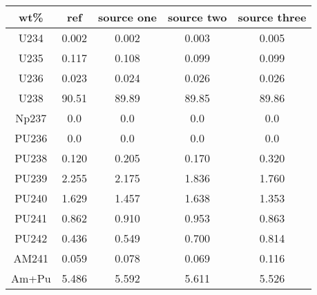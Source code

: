 	\begin{tabular}{ccccc}
		\hline
		\textbf{wt\%} & \textbf{ref} & \textbf{source one} & \textbf{source two} & \textbf{source three} \\ 
		\hline
		U234 & 0.002 & 0.002 & 0.003 & 0.005 \\ 
		U235 & 0.117 & 0.108 & 0.099 & 0.099 \\ 
		U236 & 0.023 & 0.024 & 0.026 & 0.026 \\ 
		U238 & 90.51 & 89.89 & 89.85 & 89.86 \\ 
		Np237 & 0.0 & 0.0 & 0.0 & 0.0 \\ 
		PU236 & 0.0 & 0.0 & 0.0 & 0.0 \\ 
		PU238 & 0.120 & 0.205 & 0.170 & 0.320 \\ 
		PU239 & 2.255 & 2.175 & 1.836 & 1.760 \\ 
		PU240 & 1.629 & 1.457 & 1.638 & 1.353 \\ 
		PU241 & 0.862 & 0.910 & 0.953 & 0.863 \\ 
		PU242 & 0.436 & 0.549 & 0.700 & 0.814 \\ 
		AM241 & 0.059 & 0.078 & 0.069 & 0.116 \\ 
		Am+Pu & 5.486 & 5.592 & 5.611 & 5.526 \\ 
		\hline 
	\end{tabular} 
